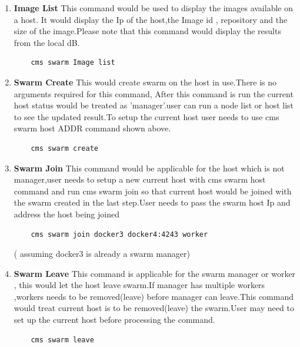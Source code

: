 \documentclass[9pt,twocolumn,twoside]{../../styles/osajnl}
\begin{document}
\begin{enumerate}
    \item \textbf{Image List}
    This command would be used to display the images available on a host.
    It would display the Ip of the host,the Image id , repository and the size of the image.Please note that this command would display the results from the local dB.\\
    
    \begin{verbatim}
    cms swarm Image list
    \end{verbatim} 

    
    \item \textbf{Swarm Create}
    This would create swarm on the host in use.There is no arguments required for this command, After this command is run the current host status would be treated as 'manager'.user can run a node list or host list to see the updated result.To setup the current host user needs to use cms swarm host ADDR command shown above.\\
    
    \begin{verbatim}
    cms swarm create
    \end{verbatim} 
    
    \item \textbf{Swarm Join}
    This command would be applicable for the host which is not manager,user needs to setup a new current host with cms swarm host command and run cms swarm join so that current host would be joined with the swarm created in the last step.User needs to pass the swarm host Ip and address the host being joined\\
    
    \begin{verbatim}
    cms swarm join docker3 docker4:4243 worker
    \end{verbatim} 
    ( assuming docker3 is already a swarm manager) 
    
    \item \textbf{Swarm Leave}
    This command is applicable for the swarm manager or worker , this would let the host leave swarm.If manager has multiple workers ,workers needs to be removed(leave) before manager can leave.This command would treat current host is to be removed(leave) the swarm.User may need to set up the current host before processing the command.\\
    
    \begin{verbatim}
    cms swarm leave 
    \end{verbatim}


\end{enumerate}
\end{document}
